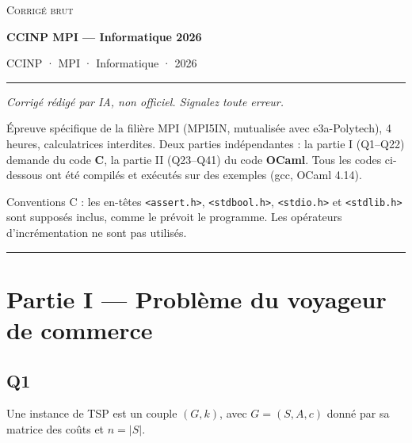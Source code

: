 \documentclass[11pt,a4paper]{article}
\begin{document}
\thispagestyle{plain}
\begin{center}
  {\small\scshape Corrigé brut}\par\smallskip
  {\LARGE\bfseries CCINP MPI — Informatique 2026\par}\medskip
  {\large CCINP · MPI · Informatique · 2026\par}
\end{center}
\vspace{2pt}\hrule\vspace{8pt}

\emph{Corrigé rédigé par IA, non officiel. Signalez toute erreur.}

Épreuve spécifique de la filière MPI (MPI5IN, mutualisée avec e3a-Polytech), 4 heures, calculatrices interdites. Deux parties indépendantes : la partie I (Q1--Q22) demande du code \textbf{C}, la partie II (Q23--Q41) du code \textbf{OCaml}. Tous les codes ci-dessous ont été compilés et exécutés sur des exemples (gcc, OCaml 4.14).

Conventions C : les en-têtes \texttt{\textless{}assert.h\textgreater{}}, \texttt{\textless{}stdbool.h\textgreater{}}, \texttt{\textless{}stdio.h\textgreater{}} et \texttt{\textless{}stdlib.h\textgreater{}} sont supposés inclus, comme le prévoit le programme. Les opérateurs d'incrémentation ne sont pas utilisés.

\begin{center}\rule{0.5\linewidth}{0.5pt}\end{center}

\hypertarget{partie-i-probluxe8me-du-voyageur-de-commerce}{%
\section{Partie I --- Problème du voyageur de commerce}\label{partie-i-probluxe8me-du-voyageur-de-commerce}}

\hypertarget{q1}{%
\subsection{Q1}\label{q1}}

Une instance de TSP est un couple \((G,k)\), avec \(G=(S,A,c)\) donné par sa matrice des coûts et \(n=|S|\).
\end{document}
